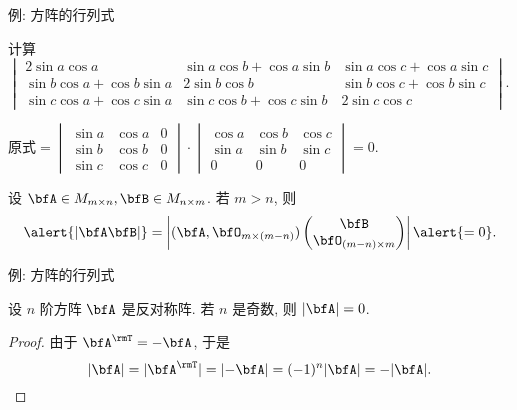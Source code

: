 \begin{frame}{例: 方阵的行列式}
	\onslide<+->
	\begin{example}
		计算
		$\begin{vmatrix}
			2\sin a\cos a&\sin a\cos b+\cos a\sin b&\sin a\cos c+\cos a\sin c\\
			\sin b\cos a+\cos b\sin a&2\sin b\cos b&\sin b\cos c+\cos b\sin c\\
			\sin c\cos a+\cos c\sin a&\sin c\cos b+\cos c\sin b&2\sin c\cos c
		\end{vmatrix}$.
	\end{example}
	\onslide<+->
	\begin{solution}
		原式$=\begin{vmatrix}
			\sin a&\cos a&0\\
			\sin b&\cos b&0\\
			\sin c&\cos c&0
		\end{vmatrix}\cdot\begin{vmatrix}
			\cos a&\cos b&\cos c\\
			\sin a&\sin b&\sin c\\
			0&0&0
		\end{vmatrix}=0$.
	\end{solution}
	\onslide<+->
	设 $\bfA\in M_{m\times n},\bfB\in M_{n\times m}$.
	\onslide<+->
	若 $m>n$, 则
	\[\alert{|\bfA\bfB|}=\left|
		(\bfA,\bfO_{m\times(m-n)})\begin{pmatrix}
		\bfB\\\bfO_{(m-n)\times m}
	\end{pmatrix}\right|\alert{=0}.\]
\end{frame}


\begin{frame}{例: 方阵的行列式}
	\onslide<+->
	\begin{example}
		设 $n$ 阶方阵 $\bfA$ 是反对称阵.
		若 $n$ 是奇数, 则 $|\bfA|=0$.
	\end{example}
	\onslide<+->
	\begin{proof}
		由于 $\bfA^\rmT=-\bfA$, 于是
		\[|\bfA|=|\bfA^\rmT|=|{-\bfA}|=(-1)^n|\bfA|=-|\bfA|.\]
	\onslide<+->{%
			故 $|\bfA|=0$.\qedhere
		}
	\end{proof}
\end{frame}


